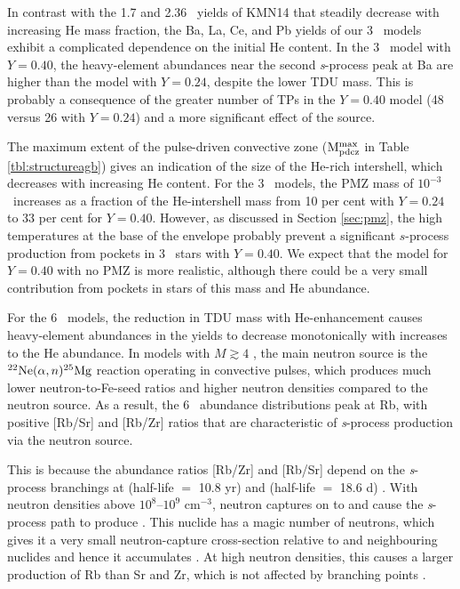 In contrast with the 1.7 and 2.36 \Msun\ yields of KMN14 that steadily decrease with increasing He mass fraction, the Ba, La, Ce, and Pb yields of our 3 \Msun\ models exhibit a complicated dependence on the initial He content. In the 3 \Msun\ model with $Y=0.40$, the heavy-element abundances near the second \textit{s}-process peak at Ba are higher than the model with $Y=0.24$, despite the lower TDU mass. This is probably a consequence of the greater number of TPs in the $Y=0.40$ model (48 versus 26 with $Y=0.24$) and a more significant effect of the  source.

The maximum extent of the pulse-driven convective zone ($\mathrm{M}_\mathrm{pdcz}^\mathrm{max}$ in Table \ref{tbl:structureagb}) gives an indication of the size of the He-rich intershell, which decreases with increasing He content. For the 3 \Msun\ models, the PMZ mass of $10^{-3}$ \Msun\  increases as a fraction of the He-intershell mass from 10 per cent with $Y=0.24$ to 33 per cent for $Y=0.40$. However, as discussed in Section \ref{sec:pmz}, the high temperatures at the base of the envelope probably prevent a significant $s$-process production from  pockets in 3 \Msun\ stars with $Y=0.40$. We expect that the model for $Y=0.40$ with no PMZ is more realistic, although there could be a very small contribution from  pockets in stars of this mass and He abundance.

For the 6 \Msun\ models, the reduction in TDU mass with He-enhancement causes heavy-element abundances in the yields to decrease monotonically with increases to the He abundance. In models with $M \gtrsim 4$ \Msun, the main neutron source is the $\mbox{${}^{22}{\text{Ne}}$}(\alpha,n)\mbox{${}^{25}{\text{Mg}}$}$ reaction operating in convective pulses, which produces much lower neutron-to-Fe-seed ratios and higher neutron densities compared to the  neutron source. As a result, the 6 \Msun\ abundance distributions peak at Rb, with positive [Rb/Sr] and [Rb/Zr] ratios that are characteristic of \textit{s}-process production via the  neutron source.

This is because the abundance ratios [Rb/Zr] and [Rb/Sr] depend on the \textit{s}-process branchings at  (half-life $=$ 10.8 yr) and  (half-life $=$ 18.6 d) \citep{Karakas:2012kc,vanRaai:2012fq}. With neutron densities above $10^8$--$10^9$ cm$^\mathrm{-3}$, neutron captures on to  and  cause the \textit{s}-process path to produce . This nuclide has a magic number of neutrons, which gives it a very small neutron-capture cross-section relative to  and neighbouring nuclides and hence it accumulates \citep{Heil:2008kl}. At high neutron densities, this causes a larger production of Rb than Sr and Zr, which is not affected by branching points \citep{DOrazi:2013bq}.

